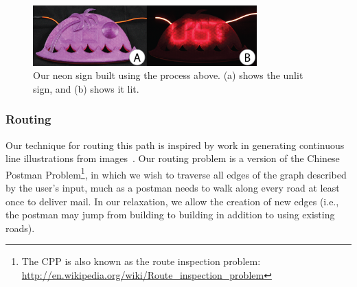 \begin{figure}[h!]
\centering
    \includegraphics[width=3.4in]{figures/uistphotos.png}
\caption{Our neon sign built using the process above.  (a) shows the unlit sign, and (b) shows it lit.}
\label{fig:UIST}
\end{figure}

\subsubsection{Routing}
%

Our technique for routing this path is inspired by work in generating continuous line illustrations from images~\cite{Bosch-tsp,Wong-continuousline}.  Our routing problem is a version of the Chinese Postman Problem\footnote{The CPP is also known as the route inspection problem: \url{http://en.wikipedia.org/wiki/Route_inspection_problem}}, in which we wish to traverse all edges of the graph described by the user's input, much as a postman needs to walk along every road at least once to deliver mail.  In our relaxation, we allow the creation of new edges (i.e., the postman may jump from building to building in addition to using existing roads).
%

